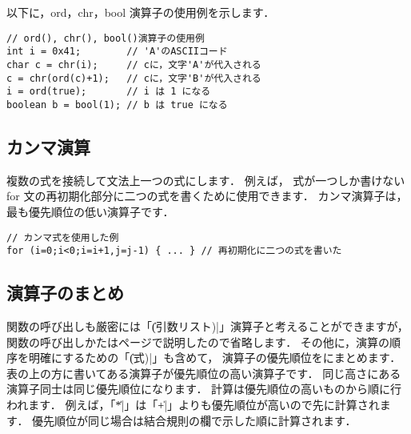 以下に，ord，chr，bool 演算子の使用例を示します．

\begin{mylist}
\begin{verbatim}
// ord(), chr(), bool()演算子の使用例
int i = 0x41;        // 'A'のASCIIコード
char c = chr(i);     // cに，文字'A'が代入される
c = chr(ord(c)+1);   // cに，文字'B'が代入される
i = ord(true);       // i は 1 になる
boolean b = bool(1); // b は true になる
\end{verbatim}
\end{mylist}

\subsection{カンマ演算}
複数の式を接続して文法上一つの式にします．
例えば，
式が一つしか書けない for 文の再初期化部分に二つの式を書くために使用できます．
カンマ演算子は，最も優先順位の低い演算子です．

\begin{mylist}
\begin{verbatim}
// カンマ式を使用した例
for (i=0;i<0;i=i+1,j=j-1) { ... } // 再初期化に二つの式を書いた
\end{verbatim}
\end{mylist}

\subsection{演算子のまとめ}

関数の呼び出しも厳密には「\|(引数リスト)|」演算子と考えることができますが，
関数の呼び出しかたは\pageref{chap3:func}ページで説明したので省略します．
その他に，演算の順序を明確にするための「\|(式)|」も含めて，
演算子の優先順位をにまとめます．
表の上の方に書いてある演算子が優先順位の高い演算子です．
同じ高さにある演算子同士は同じ優先順位になります．
計算は優先順位の高いものから順に行われます．
例えば，「\|*|」は「\|+|」よりも優先順位が高いので先に計算されます．
優先順位が同じ場合は結合規則の欄で示した順に計算されます．


